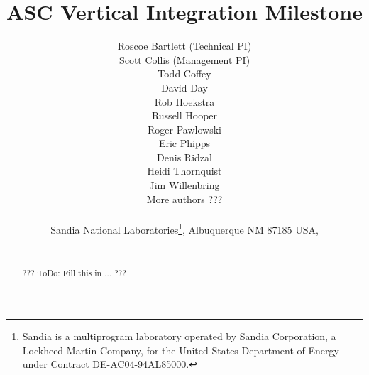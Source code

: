 \documentclass[pdf,ps2pdf,11pt]{SANDreport}
\title{\center
ASC Vertical Integration Milestone
}
\author{
Roscoe Bartlett (Technical PI) \\
Scott Collis (Management PI) \\
Todd Coffey \\
David Day \\
Rob Hoekstra \\
Russell Hooper \\
Roger Pawlowski \\
Eric Phipps \\
Denis Ridzal \\
Heidi Thornquist \\
Jim Willenbring \\
More authors ???\\ \\
Sandia National
Laboratories\footnote{ Sandia is a multiprogram laboratory operated by Sandia
Corporation, a Lockheed-Martin Company, for the United States Department of
Energy under Contract DE-AC04-94AL85000.}, Albuquerque NM 87185 USA, \\ \\
\date{}
}
\date{}
\begin{document}
\maketitle

%

%
\begin{abstract}
%

??? ToDo: Fill this in ... ???

%
\end{abstract}
%

%
%
%

%


\end{document}
